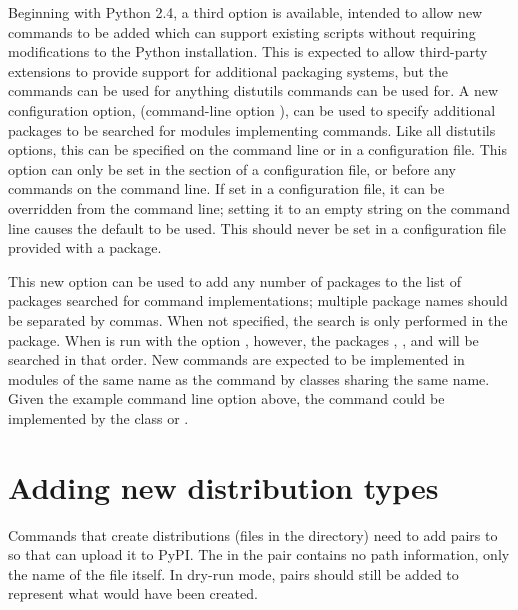 \documentclass{manual}
\begin{document}
Beginning with Python 2.4, a third option is available, intended to
allow new commands to be added which can support existing
 scripts without requiring modifications to the Python
installation.  This is expected to allow third-party extensions to
provide support for additional packaging systems, but the commands can
be used for anything distutils commands can be used for.  A new
configuration option,  (command-line option
), can be used to specify additional
packages to be searched for modules implementing commands.  Like all
distutils options, this can be specified on the command line or in a
configuration file.  This option can only be set in the
\code{[global]} section of a configuration file, or before any
commands on the command line.  If set in a configuration file, it can
be overridden from the command line; setting it to an empty string on
the command line causes the default to be used.  This should never be
set in a configuration file provided with a package.

This new option can be used to add any number of packages to the list
of packages searched for command implementations; multiple package
names should be separated by commas.  When not specified, the search
is only performed in the  package.  When
 is run with the option
 ,
however, the packages , ,
and  will be searched in that order.  New commands
are expected to be implemented in modules of the same name as the
command by classes sharing the same name.  Given the example command
line option above, the command  could be
implemented by the class 
or .

\section{Adding new distribution types}

Commands that create distributions (files in the 
directory) need to add  pairs to
 so that  can
upload it to PyPI.  The  in the pair contains no path
information, only the name of the file itself.  In dry-run mode, pairs
should still be added to represent what would have been created.
\end{document}
